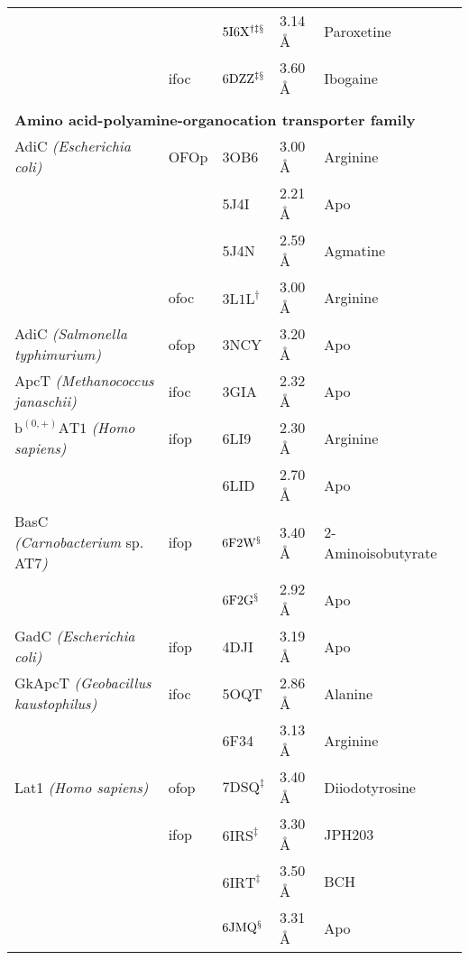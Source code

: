 \begin{center}
\begin{tabular}{l l l l l r}
& & $\mathrm{5I6X^{\dagger \ddagger \mathsection}}$ & 3.14 \AA & Paroxetine & \citep*{Coleman2016} \\
& \gls{ifoc} & $\mathrm{6DZZ^{\ddagger \mathsection}}$ & 3.60 \AA & Ibogaine & \citep*{Coleman2019} \\
\\
\multicolumn{5}{l}{\textbf{Amino acid-polyamine-organocation transporter family}}
\\
AdiC \emph{(Escherichia coli)} & OFOp & 3OB6 & 3.00 \AA & Arginine & \citep*{Kowalczyk2011} \\
& & 5J4I & 2.21 \AA & Apo & \citep*{Ilgu2016} \\
& & 5J4N & 2.59 \AA & Agmatine & \citep*{Ilgu2016} \\
& \gls{ofoc} & $\mathrm{3L1L^{\dagger}}$ & 3.00 \AA & Arginine & \citep*{Fang2009} \\
AdiC \emph{(Salmonella typhimurium)} & \gls{ofop} & 3NCY & 3.20 \AA & Apo & \citep*{Fang2009} \\
ApcT \emph{(Methanococcus janaschii)} & \gls{ifoc} & 3GIA & 2.32 \AA & Apo & \citep*{Shaffer2009} \\
$\mathrm{b^{(0,+)}AT1}$ \emph{(Homo sapiens)} & \gls{ifop} & 6LI9 & 2.30 \AA & Arginine & \citep*{Yan2020a} \\ 
& & 6LID & 2.70 \AA & Apo & \citep*{Yan2020a} \\
BasC \emph{(Carnobacterium} sp. AT7\emph{)} & \gls{ifop} & $\mathrm{6F2W^{\mathsection}}$ & 3.40 \AA & 2-Aminoisobutyrate & \citep*{Errasti-Murugarren2019} \\
& & $\mathrm{6F2G^{\mathsection}}$ & 2.92 \AA & Apo & \citep*{Errasti-Murugarren2019} \\
GadC \emph{(Escherichia coli)} & \gls{ifop} & 4DJI & 3.19 \AA & Apo & \citep*{Ma2012} \\
GkApcT \emph{(Geobacillus kaustophilus)} & \gls{ifoc} & 5OQT & 2.86 \AA & Alanine & \citep*{Jungnickel2018} \\
& & 6F34 & 3.13 \AA & Arginine & \citep*{Jungnickel2018} \\
Lat1 \emph{(Homo sapiens)} & \gls{ofop} & $\mathrm{7DSQ^{\ddagger}}$ & 3.40 \AA & Diiodotyrosine & \citep*{Yan2021} \\
& \gls{ifop} & $\mathrm{6IRS^{\ddagger}}$ & 3.30 \AA & JPH203 & \citep*{Yan2019} \\
& & $\mathrm{6IRT^{\ddagger}}$ & 3.50 \AA & BCH & \citep*{Yan2019} \\
& & $\mathrm{6JMQ^{\mathsection}}$ & 3.31 \AA & Apo & \citep*{Lee2019} \\

\end{tabular}
\end{center}
